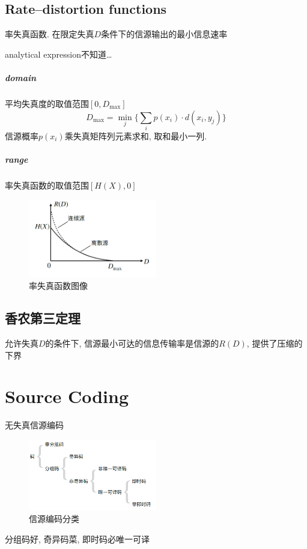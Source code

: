 \documentclass[a4paper]{report}
\begin{document}
\section{Rate–distortion functions}

率失真函数. 在限定失真$D$条件下的信源输出的最小信息速率

analytical expression不知道\dots
\paragraph{domain}平均失真度的取值范围$[0,D_{\max}]$
$$D_{\max}=\underset{j}{\min} \{ \displaystyle\sum_{i} p(x_i)\cdot d(x_i,y_j) \}$$
信源概率$p(x_i)$乘失真矩阵列元素求和, 取和最小一列. 
\paragraph{range}率失真函数的取值范围$[H(X),0]$
\begin{figure}[H]
\centering
\includegraphics[width=0.5\textwidth]{rate_distortion.png}
\caption{率失真函数图像}
\end{figure}
\section{香农第三定理}
允许失真$D$的条件下, 信源最小可达的信息传输率是信源的$R(D)$, 提供了压缩的下界

\chapter{Source Coding}
无失真信源编码

\begin{figure}[H]
\centering
\includegraphics[width=0.5\textwidth]{source_coding_type.png}
\caption{信源编码分类}
\end{figure}
分组码好, 奇异码菜, 即时码必唯一可译
\end{document}
